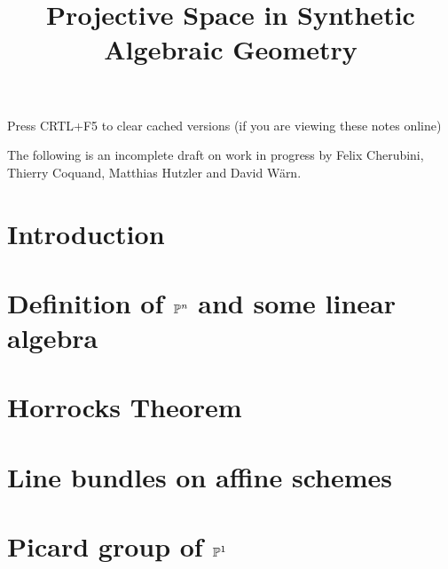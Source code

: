 \documentclass{../util/zariski}
\title{Projective Space in Synthetic Algebraic Geometry}
\begin{document}
\maketitle

\begin{center}
  \color{purple}
  \large{Press CRTL+F5 to clear cached versions}
  \large{(if you are viewing these notes online)}
\end{center}

The following is an incomplete draft on work in progress
by Felix Cherubini, Thierry Coquand, Matthias Hutzler and David Wärn.

 \section*{Introduction}


\section[Definition of projective space and some linear algebra]{Definition of $\mathbb{P}^n$ and some linear algebra}


\section{Horrocks Theorem}


\section{Line bundles on affine schemes}


\section[Picard group of projective space]{Picard group of $\mathbb{P}^1$}


\newpage



\printindex

\printbibliography
\end{document}
